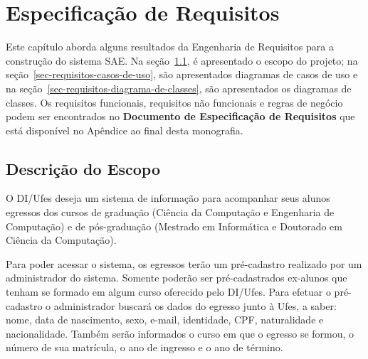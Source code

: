 
\chapter{Especificação de Requisitos}
\label{sec-unagi}

Este capítulo aborda alguns resultados da Engenharia de Requisitos para a construção do sistema SAE. Na seção~\ref{sec-requisitos-escopo}, é apresentado o escopo do projeto; na seção~\ref{sec-requisitos-casos-de-uso}, são apresentados diagramas de casos de uso e na seção~\ref{sec-requisitos-diagrama-de-classes}, são apresentados os diagramas de classes. Os requisitos funcionais, requisitos não funcionais e regras de negócio podem ser encontrados no \textbf{Documento de Especificação de Requisitos} que está disponível no Apêndice ao final desta monografia.


\section{Descrição do Escopo}
\label{sec-requisitos-escopo}

O DI/Ufes deseja um sistema de informação para acompanhar seus alunos egressos dos cursos de graduação (Ciência da Computação e Engenharia de Computação) e de pós-graduação (Mestrado em Informática e Doutorado em Ciência da Computação). 

Para poder acessar o sistema, os egressos terão um pré-cadastro realizado por um administrador do sistema. Somente poderão ser pré-cadastrados ex-alunos que tenham se formado em algum curso oferecido pelo DI/Ufes. Para efetuar o pré-cadastro o administrador buscará os dados do egresso junto à Ufes, a saber: nome, data de nascimento, sexo, e-mail, identidade, CPF, naturalidade e nacionalidade. Também serão informados o curso em que o egresso se formou, o número de sua matrícula, o ano de ingresso e o ano de término. 

